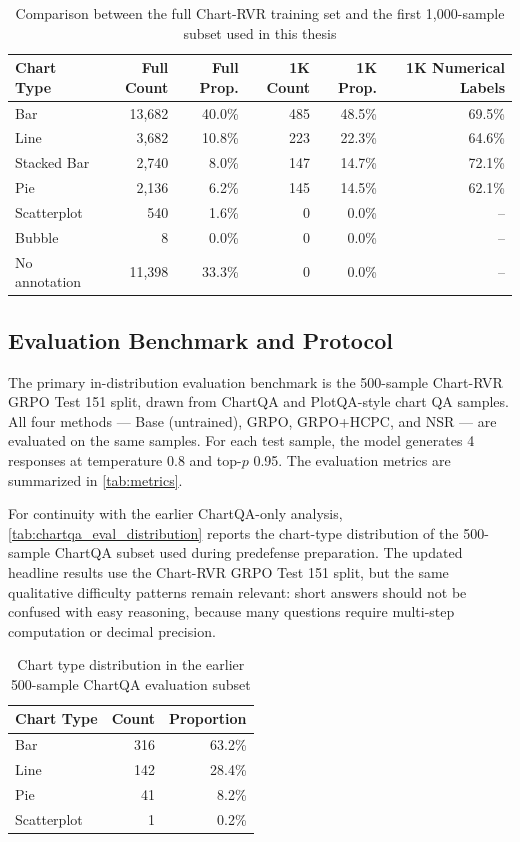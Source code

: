 \documentclass{iutbscthesis}
\begin{document}
\begin{table}[H]
    \centering
    \small
    \begin{tabular}{lrrrrr}
        \toprule
        Chart Type & Full Count & Full Prop. & 1K Count & 1K Prop. & 1K Numerical Labels \\
        \midrule
        Bar & 13,682 & 40.0\% & 485 & 48.5\% & 69.5\% \\
        Line & 3,682 & 10.8\% & 223 & 22.3\% & 64.6\% \\
        Stacked Bar & 2,740 & 8.0\% & 147 & 14.7\% & 72.1\% \\
        Pie & 2,136 & 6.2\% & 145 & 14.5\% & 62.1\% \\
        Scatterplot & 540 & 1.6\% & 0 & 0.0\% & -- \\
        Bubble & 8 & 0.0\% & 0 & 0.0\% & -- \\
        No annotation & 11,398 & 33.3\% & 0 & 0.0\% & -- \\
        \bottomrule
    \end{tabular}
    \caption{Comparison between the full Chart-RVR training set and the first 1,000-sample subset used in this thesis}
    \label{tab:full_vs_subset}
\end{table}

\subsection{Evaluation Benchmark and Protocol}

The primary in-distribution evaluation benchmark is the 500-sample Chart-RVR GRPO Test 151 split, drawn from ChartQA and PlotQA-style chart QA samples. All four methods --- Base (untrained), GRPO, GRPO+HCPC, and NSR --- are evaluated on the same samples. For each test sample, the model generates 4 responses at temperature 0.8 and top-$p$ 0.95. The evaluation metrics are summarized in \autoref{tab:metrics}.

For continuity with the earlier ChartQA-only analysis, \autoref{tab:chartqa_eval_distribution} reports the chart-type distribution of the 500-sample ChartQA subset used during predefense preparation. The updated headline results use the Chart-RVR GRPO Test 151 split, but the same qualitative difficulty patterns remain relevant: short answers should not be confused with easy reasoning, because many questions require multi-step computation or decimal precision.

\begin{table}[H]
    \centering
    \begin{tabular}{lrr}
        \toprule
        Chart Type & Count & Proportion \\
        \midrule
        Bar & 316 & 63.2\% \\
        Line & 142 & 28.4\% \\
        Pie & 41 & 8.2\% \\
        Scatterplot & 1 & 0.2\% \\
        \bottomrule
    \end{tabular}
    \caption{Chart type distribution in the earlier 500-sample ChartQA evaluation subset}
    \label{tab:chartqa_eval_distribution}
\end{table}
\end{document}
